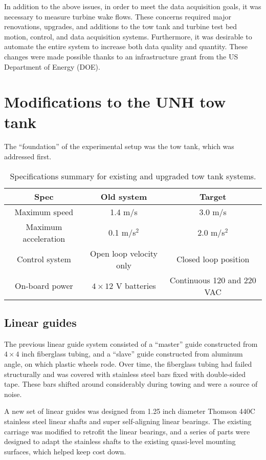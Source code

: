 In addition to the above issues, in order to meet the data acquisition goals, it
was necessary to measure turbine wake flows. These concerns required major
renovations, upgrades, and additions to the tow tank and turbine test bed
motion, control, and data acquisition systems. Furthermore, it was desirable to
automate the entire system to increase both data quality and quantity. These
changes were made possible thanks to an infrastructure grant from the US
Department of Energy (DOE).


\section{Modifications to the UNH tow tank}

The ``foundation'' of the experimental setup was the tow tank, which was
addressed first.

\begin{table}
\centering
\begin{tabular}{c|c|c}
Spec & Old system & Target \\ 
\hline
Maximum speed & 1.4 m/s  & 3.0 m/s \\ 
Maximum acceleration & 0.1 m/s$^2$ & 2.0 m/s$^2$ \\ 
Control system & Open loop velocity only & Closed loop position \\ 
On-board power & $4\times12$ V batteries & Continuous 120 and 220 VAC \\ 
\end{tabular}
\caption{Specifications summary for existing and upgraded tow tank systems.} 
\label{tab:tow-tank-specs}
\end{table}

\subsection{Linear guides}

The previous linear guide system consisted of a ``master'' guide constructed
from $4 \times 4$ inch fiberglass tubing, and a ``slave'' guide constructed from
aluminum angle, on which plastic wheels rode. Over time, the fiberglass tubing
had failed structurally and was covered with stainless steel bars fixed with
double-sided tape. These bars shifted around considerably during towing and were
a source of noise.

A new set of linear guides was designed from 1.25 inch diameter Thomson 440C
stainless steel linear shafts and super self-aligning linear bearings. The
existing carriage was modified to retrofit the linear bearings, and a series of
parts were designed to adapt the stainless shafts to the existing quasi-level
mounting surfaces, which helped keep cost down.



